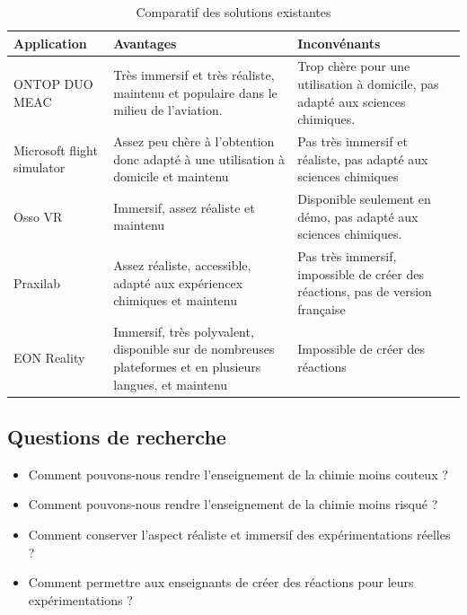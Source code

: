 \begin{table}[H]
	\centering
	\caption{Comparatif des solutions existantes}
	\begin{tabular}{|l|p{5cm}|p{5cm}|}
		\hline
		\textbf{Application}       & \textbf{Avantages}                                                                                      & \textbf{Inconvénants}                                                          \\ \hline
		ONTOP DUO MEAC             & Très immersif et très réaliste, maintenu et populaire dans le milieu de l'aviation.                          & Trop chère pour une utilisation à domicile, pas adapté aux sciences chimiques. \\ \hline
		Microsoft flight simulator & Assez peu chère à l'obtention donc adapté à une utilisation à domicile et maintenu                      & Pas très immersif et réaliste, pas adapté aux sciences chimiques                \\ \hline
		Osso VR                    & Immersif, assez réaliste et maintenu                                                                    & Disponible seulement en démo, pas adapté aux sciences chimiques.                \\ \hline
		Praxilab                   & Assez réaliste, accessible, adapté aux expériencex chimiques et maintenu                                   & Pas très immersif, impossible de créer des réactions, pas de version française \\ \hline
		EON Reality                & Immersif, très polyvalent, disponible sur de nombreuses plateformes et en plusieurs langues, et maintenu & Impossible de créer des réactions                                              \\ \hline
	\end{tabular}
\end{table}

\subsection{Questions de recherche}

\begin{itemize}
	\item Comment pouvons-nous rendre l'enseignement de la chimie moins couteux ?
	\item Comment pouvons-nous rendre l'enseignement de la chimie moins risqué ?
	\item Comment conserver l'aspect réaliste et immersif des expérimentations réelles ?
	\item Comment permettre aux enseignants de créer des réactions pour leurs expérimentations ?
\end{itemize}

